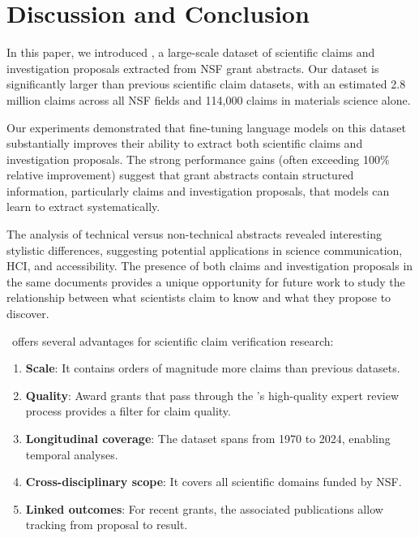 \documentclass[11pt]{article}
\begin{document}
\section{Discussion and Conclusion}

In this paper, we introduced \DatasetName, a large-scale dataset of scientific claims and investigation proposals extracted from NSF grant abstracts. Our dataset is significantly larger than previous scientific claim datasets, with an estimated 2.8 million claims across all NSF fields and 114,000 claims in materials science alone.

Our experiments demonstrated that fine-tuning language models on this dataset substantially improves their ability to extract both scientific claims and investigation proposals. The strong performance gains (often exceeding 100\% relative improvement) suggest that grant abstracts contain structured information, particularly claims and investigation proposals, that models can learn to extract systematically.

The analysis of technical versus non-technical abstracts revealed interesting stylistic differences, suggesting potential applications in science communication, HCI, and accessibility. The presence of both claims and investigation proposals in the same documents provides a unique opportunity for future work to study the relationship between what scientists claim to know and what they propose to discover.

\DatasetName~offers several advantages for scientific claim verification research:
\begin{enumerate}[noitemsep,topsep=0pt]
\item \textbf{Scale}: It contains orders of magnitude more claims than previous datasets.
\item \textbf{Quality}: Award grants that pass through the \NSF's high-quality expert review process provides a filter for claim quality.
\item \textbf{Longitudinal coverage}: The dataset spans from 1970 to 2024, enabling temporal analyses.
\item \textbf{Cross-disciplinary scope}: It covers all scientific domains funded by NSF.
\item \textbf{Linked outcomes}: For recent grants, the associated publications allow tracking from proposal to result.
\end{enumerate}
\end{document}
